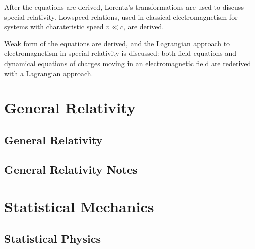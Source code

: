 \documentclass[letterpaper,10pt,english]{jupyterBook}
\begin{document}
\sphinxAtStartPar
{} After the equations are derived, Lorentz’s transformations are used to discuss special relativity. Low\sphinxhyphen{}speed relations, used in classical electromagnetism for systems with charateristic speed \(v \ll c\), are derived.

\sphinxAtStartPar
{} Weak form of the equations are derived, and the Lagrangian approach to electromagnetism in special relativity is discussed: both field equations and dynamical equations of charges moving in an electromagnetic field are re\sphinxhyphen{}derived with a Lagrangian approach.

\sphinxstepscope


\part{General Relativity}

\sphinxstepscope


\chapter{General Relativity}
\label{\detokenize{ch/relativity-general/intro:general-relativity}}\label{\detokenize{ch/relativity-general/intro:relativity-general-intro}}\label{\detokenize{ch/relativity-general/intro::doc}}
\sphinxstepscope


\chapter{General Relativity \sphinxhyphen{} Notes}
\label{\detokenize{ch/relativity-general/notes:general-relativity-notes}}\label{\detokenize{ch/relativity-general/notes:relativity-general-notes}}\label{\detokenize{ch/relativity-general/notes::doc}}
\sphinxstepscope


\part{Statistical Mechanics}

\sphinxstepscope


\chapter{Statistical Physics}
\label{\detokenize{ch/statistical-mechanics/intro:statistical-physics}}\label{\detokenize{ch/statistical-mechanics/intro:statistical-mechanics-intro}}\label{\detokenize{ch/statistical-mechanics/intro::doc}}
\sphinxstepscope
\end{document}
